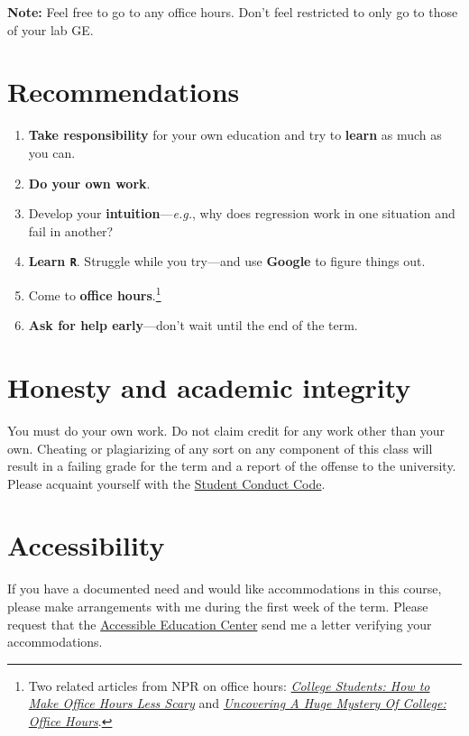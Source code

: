 \documentclass[10pt]{article}
\begin{document}
\noindent \textbf{Note:} Feel free to go to any office hours. Don't feel restricted to only go to those of your lab GE.

\section*{Recommendations}

\begin{enumerate}
  \item \textbf{Take responsibility} for your own education and try to \textbf{learn} as much as you can.
  \item \textbf{Do your own work}.
  \item Develop your \textbf{intuition}---\textit{e.g.}, why does regression work in one situation and fail in another?
  \item \textbf{Learn \texttt{R}}. Struggle while you try---and use \textbf{Google} to figure things out.
  \item Come to \textbf{office hours}.\footnote{Two related articles from NPR on office hours: \href{https://www.npr.org/2019/10/05/678815966/college-students-how-to-make-office-hours-less-scary}{\textit{College Students: How to Make Office Hours Less Scary}} and \href{https://www.npr.org/2019/10/02/766568824/uncovering-a-huge-mystery-of-college-office-hours}{\textit{Uncovering A Huge Mystery Of College: Office Hours}}.}
  \item \textbf{Ask for help early}---don't wait until the end of the term.
\end{enumerate}

\section*{Honesty and academic integrity}

You must do your own work. Do not claim credit for any work other than your own. Cheating or plagiarizing of any sort on any component of this class will result in a failing grade for the term and a report of the offense to the university. Please acquaint yourself with the \href{http://studentlife.uoregon.edu}{Student Conduct Code}.

\section*{Accessibility}

If you have a documented need and would like accommodations in this course, please make arrangements with me during the first week of the term. Please request that the \href{https://aec.uoregon.edu/}{Accessible Education Center} send me a letter verifying your accommodations.
\end{document}
